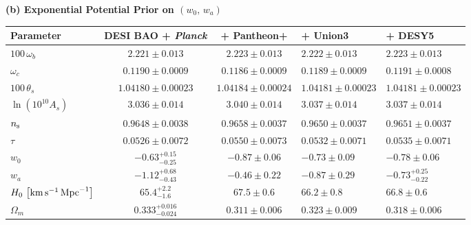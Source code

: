 \begin{subappendices}
\begin{table}[hb!]
	\textbf{(b) Exponential Potential Prior on $(w_0,\,w_a)$}\\[4pt]
		\begingroup
		\renewcommand{\arraystretch}{1.05}
		\begin{tabularx}{\textwidth}{@{}>{\raggedright\arraybackslash}p{3.2cm} c c W W @{}}
			\toprule
			Parameter & DESI BAO + {\it Planck} & + Pantheon+ & + Union3 & + DESY5 \\
			\midrule[0.065em]
			$100\,\omega_b$ & $2.221 \pm 0.013$ & $2.223 \pm 0.013$ & $2.222 \pm 0.013$ & $2.223 \pm 0.013$ \\
			$\omega_c$ & $0.1190 \pm 0.0009$ & $0.1186 \pm 0.0009$ & $0.1189 \pm 0.0009$ & $0.1191 \pm 0.0008$ \\
			$100\,\theta_s$ & $1.04180 \pm 0.00023$ & $1.04184 \pm 0.00024$ & $1.04181 \pm 0.00023$ & $1.04181 \pm 0.00023$ \\
			$\ln\left(10^{10}A_s\right)$ & $3.036 \pm 0.014$ & $3.040 \pm 0.014$ & $3.037 \pm 0.014$ & $3.037 \pm 0.014$ \\
			$n_{\rm s}$ & $0.9648 \pm 0.0038$ & $0.9658 \pm 0.0037$ & $0.9650 \pm 0.0037$ & $0.9651 \pm 0.0037$ \\
			$\tau$ & $0.0526 \pm 0.0072$ & $0.0550 \pm 0.0073$ & $0.0532 \pm 0.0071$ & $0.0535 \pm 0.0071$ \\
			$w_0$ & $-0.63^{+0.15}_{-0.25}$ & $-0.87\pm 0.06$ & $-0.73\pm 0.09$ & $-0.78\pm 0.06$ \\
			$w_a$ & $-1.12^{+0.68}_{-0.43}$ & $-0.46\pm 0.22$ & $-0.87\pm 0.29$ & $-0.73^{+0.25}_{-0.22}$ \\
			$H_0\,\left[{\rm km}\,{\rm s}^{-1}\,{\rm Mpc}^{-1}\right]$ & $65.4^{+2.2}_{-1.6}$ & $67.5\pm 0.6$ & $66.2\pm 0.8$ & $66.8\pm 0.6$ \\
			$\Omega_m$ & $0.333^{+0.016}_{-0.024}$ & $0.311\pm 0.006$ & $0.323\pm 0.009$ & $0.318\pm 0.006$ \\
			\bottomrule
		\end{tabularx}
		\endgroup

	\vspace{8pt}


\end{table}
\end{subappendices}
